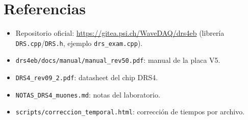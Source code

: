 \documentclass[11pt,a4paper]{article}
\newcommand{\code}[1]{\texttt{#1}}
\begin{document}
\section{Referencias}

\begin{itemize}[itemsep=2pt]
  \item Repositorio oficial: \url{https://gitea.psi.ch/WaveDAQ/drs4eb} (librería
        \code{DRS.cpp}/\code{DRS.h}, ejemplo \code{drs\_exam.cpp}).
  \item \code{drs4eb/docs/manual/manual\_rev50.pdf}: manual de la placa V5.
  \item \code{DRS4\_rev09\_2.pdf}: datasheet del chip DRS4.
  \item \code{NOTAS\_DRS4\_muones.md}: notas del laboratorio.
  \item \code{scripts/correccion\_temporal.html}: corrección de tiempos por archivo.
\end{itemize}
\end{document}

